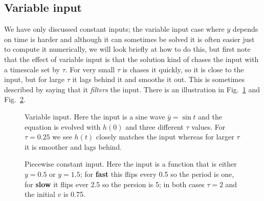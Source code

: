 \documentclass{article}
\begin{document}
\subsection*{Variable input}

We have only discussed constant inputs; the variable input case where
$y$ depends on time is harder and although it can sometimes be solved
it is often easier just to compute it numerically, we will look
briefly at how to do this, but first note that the effect of variable
input is that the solution kind of chases the input with a timescale
set by $\tau$. For very small $\tau$ is chases it quickly, so it is
close to the input, but for large $\tau$ it lags behind it and smooths
it out. This is sometimes described by saying that it \textsl{filters}
the input. There is an illustration in Fig.~\ref{chasing} and Fig.~\ref{pw}.

\begin{figure}
\begin{center}

\end{center}
\caption{Variable input. Here the input is a sine wave
  $\bar{y}=\sin{t}$ and the equation is evolved with $h(0)$ and three
  different $\tau$ values. For $\tau=0.25$ we see $h(t)$ closely
  matches the input whereas for larger $\tau$ it is smoother and lags
  behind.\label{chasing}}
\end{figure}


\begin{figure}
\begin{center}

\end{center}
\caption{Piecewise constant input. Here the input is a function that
  is either $y=0.5$ or $y=1.5$; for \textbf{fast} this flips every 0.5
  so the period is one, for \textbf{slow} it flips ever 2.5 so the
  persion is 5; in both cases $\tau=2$ and the initial $v$ is 0.75.\label{pw}}
\end{figure}
\end{document}
